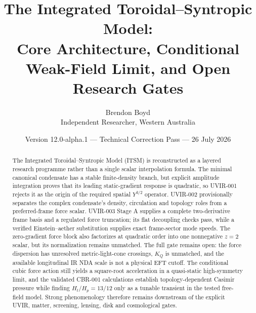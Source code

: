 \documentclass[11pt]{article}
\title{The Integrated Toroidal--Syntropic Model:\\
Core Architecture, Conditional Weak-Field Limit, and Open Research Gates}
\author{Brendon Boyd\\Independent Researcher, Western Australia}
\date{Version 12.0-alpha.1 --- Technical Correction Pass --- 26 July 2026}
\begin{document}
\maketitle

\begin{center}
\end{center}

\begin{abstract}
The Integrated Toroidal--Syntropic Model (ITSM) is reconstructed as a layered
research programme rather than a single scalar interpolation formula.  The
minimal canonical condensate has a stable finite-density branch, but explicit
amplitude integration proves that its leading static-gradient response is
quadratic, so UVIR-001 rejects it as the origin of the required spatial
$Y^{3/2}$ operator.  UVIR-002 provisionally separates the complex condensate's
density, circulation and topology roles from a preferred-frame force scalar.
UVIR-003 Stage A supplies a complete two-derivative frame basis and a regulated
force truncation; its flat decoupling checks pass, while a verified
Einstein--aether substitution supplies exact frame-sector mode speeds.  The
zero-gradient force block also factorizes at quadratic order into one
nonnegative $z=2$ scalar, but its normalization remains unmatched.  The
full gate remains open: the force dispersion has unresolved metric-light-cone
crossings, $K_Q$ is unmatched, and the available longitudinal IR NDA scale is
not a physical EFT cutoff.  The conditional cubic force action still yields a
square-root acceleration in a quasi-static high-symmetry limit, and the
validated CBR-001 calculations establish topology-dependent Casimir pressure
while finding $H_t/H_p=13/12$ only as a tunable transient in the tested
free-field model.  Strong phenomenology therefore remains downstream of the
explicit UVIR, matter, screening, lensing, disk and cosmological gates.
\end{abstract}

\tableofcontents











\end{document}
